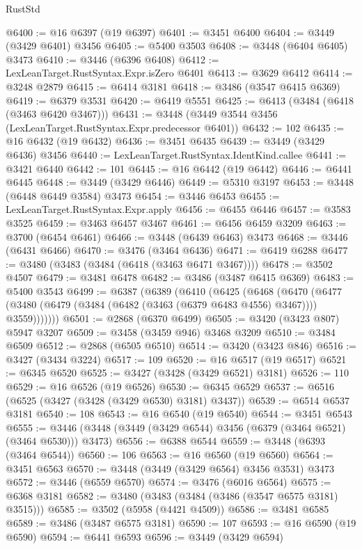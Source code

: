 \begin{lexlean}{RustStd}
\begin{coremodule}
{\begin{coremodule}
{{{{{{{{{{{{{{{{{{{{{{{{{{{{{{{{{{{{{{{{{{{{{{{{{{{{{{{{{{{{{{{{{{{{{{{{{{{{{{{{{{{{{@6400 := @16 @6397 (@19 @6397)
@6401 := @3451 @6400
@6404 := @3449 (@3429 @6401) @3456
@6405 := @5400 @3503
@6408 := @3448 (@6404 @6405) @3473
@6410 := @3446 (@6396 @6408)
@6412 := LexLeanTarget.RustSyntax.Expr.isZero @6401
@6413 := @3629 @6412
@6414 := @3248 @2879
@6415 := @6414 @3181
@6418 := @3486 (@3547 @6415 @6369)
@6419 := @6379 @3531
@6420 := @6419 @5551
@6425 := @6413 (@3484 (@6418 (@3463 @6420 @3467)))
@6431 := @3448 (@3449 @3544 @3456 (LexLeanTarget.RustSyntax.Expr.predecessor @6401))
@6432 := 102
@6435 := @16 @6432 (@19 @6432)
@6436 := @3451 @6435
@6439 := @3449 (@3429 @6436) @3456
@6440 := LexLeanTarget.RustSyntax.IdentKind.callee
@6441 := @3421 @6440
@6442 := 101
@6445 := @16 @6442 (@19 @6442)
@6446 := @6441 @6445
@6448 := @3449 (@3429 @6446)
@6449 := @5310 @3197
@6453 := @3448 (@6448 @6449 @3584) @3473
@6454 := @3446 @6453
@6455 := LexLeanTarget.RustSyntax.Expr.apply
@6456 := @6455 @6446
@6457 := @3583 @3525
@6459 := @3463 @6457 @3467
@6461 := @6456 @6459 @3209
@6463 := @3700 (@6454 @6461)
@6466 := @3448 (@6439 @6463) @3473
@6468 := @3446 (@6431 @6466)
@6470 := @3476 (@3464 @6436)
@6471 := @6419 @6288
@6477 := @3480 (@3483 (@3484 (@6418 (@3463 @6471 @3467))))
@6478 := @3502 @4507
@6479 := @3481 @6478
@6482 := @3486 (@3487 @6415 @6369)
@6483 := @5400 @3543
@6499 := @6387
    (@6389
      (@6410
        (@6425
          (@6468
            (@6470
              (@6477 (@3480 (@6479 (@3484 (@6482 (@3463 (@6379 @6483 @4556) @3467)))) @3559)))))))
@6501 := @2868 (@6370 @6499)
@6505 := @3420 (@3423 @807) @5947 @3207
@6509 := @3458 (@3459 @946) @3468 @3209
@6510 := @3484 @6509
@6512 := @2868 (@6505 @6510)
@6514 := @3420 (@3423 @846)
@6516 := @3427 (@3434 @3224)
@6517 := 109
@6520 := @16 @6517 (@19 @6517)
@6521 := @6345 @6520
@6525 := @3427 (@3428 (@3429 @6521) @3181)
@6526 := 110
@6529 := @16 @6526 (@19 @6526)
@6530 := @6345 @6529
@6537 := @6516 (@6525 (@3427 (@3428 (@3429 @6530) @3181) @3437))
@6539 := @6514 @6537 @3181
@6540 := 108
@6543 := @16 @6540 (@19 @6540)
@6544 := @3451 @6543
@6555 := @3446 (@3448 (@3449 (@3429 @6544) @3456 (@6379 (@3464 @6521) (@3464 @6530))) @3473)
@6556 := @6388 @6544
@6559 := @3448 (@6393 (@3464 @6544))
@6560 := 106
@6563 := @16 @6560 (@19 @6560)
@6564 := @3451 @6563
@6570 := @3448 (@3449 (@3429 @6564) @3456 @3531) @3473
@6572 := @3446 (@6559 @6570)
@6574 := @3476 (@6016 @6564)
@6575 := @6368 @3181
@6582 := @3480 (@3483 (@3484 (@3486 (@3547 @6575 @3181) @3515)))
@6585 := @3502 (@5958 (@4421 @4509))
@6586 := @3481 @6585
@6589 := @3486 (@3487 @6575 @3181)
@6590 := 107
@6593 := @16 @6590 (@19 @6590)
@6594 := @6441 @6593
@6596 := @3449 (@3429 @6594)
}}}}}}}}}}}}}}}}}}}}}}}}}}}}}}}}}}}}}}}}}}}}}}}}}}}}}}}}}}}}}}}}}}}}}}}}}}}}}}}}}}}}}
\end{coremodule}}
\end{coremodule}
\end{lexlean}
